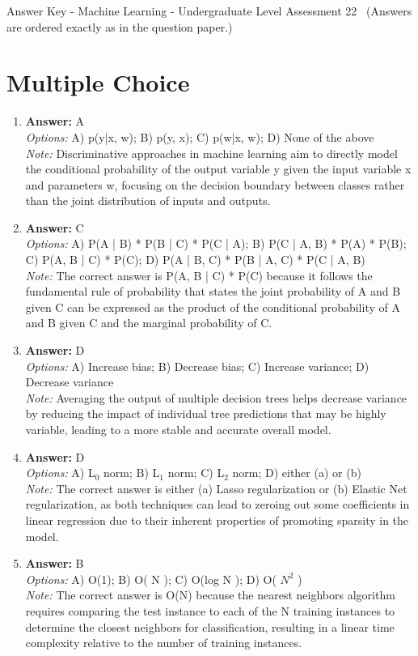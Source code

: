 \documentclass[12pt]{article}
\begin{document}
\begin{center}
Answer Key - Machine Learning - Undergraduate Level Assessment 22 \
\small (Answers are ordered exactly as in the question paper.)
\end{center}

\section*{Multiple Choice}
\begin{enumerate}[label=\arabic*.]
\item \textbf{Answer:} A
\\ \textit{Options:} A) p(y|x, w); B) p(y, x); C) p(w|x, w); D) None of the above
\\ \textit{Note:} Discriminative approaches in machine learning aim to directly model the conditional probability of the output variable y given the input variable x and parameters w, focusing on the decision boundary between classes rather than the joint distribution of inputs and outputs.
\item \textbf{Answer:} C
\\ \textit{Options:} A) P(A | B) * P(B | C) * P(C | A); B) P(C | A, B) * P(A) * P(B); C) P(A, B | C) * P(C); D) P(A | B, C) * P(B | A, C) * P(C | A, B)
\\ \textit{Note:} The correct answer is P(A, B | C) * P(C) because it follows the fundamental rule of probability that states the joint probability of A and B given C can be expressed as the product of the conditional probability of A and B given C and the marginal probability of C.
\item \textbf{Answer:} D
\\ \textit{Options:} A) Increase bias; B) Decrease bias; C) Increase variance; D) Decrease variance
\\ \textit{Note:} Averaging the output of multiple decision trees helps decrease variance by reducing the impact of individual tree predictions that may be highly variable, leading to a more stable and accurate overall model.
\item \textbf{Answer:} D
\\ \textit{Options:} A) L$_{0}$ norm; B) L$_{1}$ norm; C) L$_{2}$ norm; D) either (a) or (b)
\\ \textit{Note:} The correct answer is either (a) Lasso regularization or (b) Elastic Net regularization, as both techniques can lead to zeroing out some coefficients in linear regression due to their inherent properties of promoting sparsity in the model.
\item \textbf{Answer:} B
\\ \textit{Options:} A) O(1); B) O( N ); C) O(log N ); D) O( $N^2$ )
\\ \textit{Note:} The correct answer is O(N) because the nearest neighbors algorithm requires comparing the test instance to each of the N training instances to determine the closest neighbors for classification, resulting in a linear time complexity relative to the number of training instances.
\end{enumerate}
\end{document}
